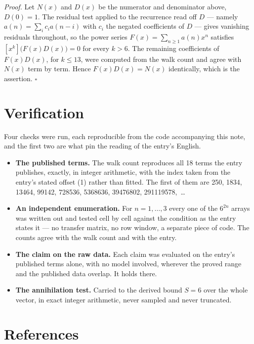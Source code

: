 \documentclass[11pt]{article}
\theoremstyle{definition}
\begin{document}
{\itshape Proof.} Let $N(x)$ and $D(x)$ be the numerator and denominator above, $D(0)=1$. The residual test applied to the recurrence read off $D$ --- namely $a(n) = \sum_i c_i a(n-i)$ with $c_i$ the negated coefficients of $D$ --- gives vanishing residuals throughout, so the power series $F(x)=\sum_{n\ge 1}a(n)x^n$ satisfies $[x^k]\bigl(F(x)D(x)\bigr) = 0$ for every $k > 6$. The remaining coefficients of $F(x)D(x)$, for $k \le 13$, were computed from the walk count and agree with $N(x)$ term by term. Hence $F(x)D(x) = N(x)$ identically, which is the assertion. $\square$

\section{Verification}

Four checks were run, each reproducible from the code accompanying this note, and the first two are what pin the reading of the entry's English.

\begin{itemize}

\item {\bfseries The published terms.} The walk count reproduces all 18 terms the entry publishes, exactly, in integer arithmetic, with the index taken from the entry's stated offset (1) rather than fitted. The first of them are 250, 1834, 13464, 99142, 728536, 5368636, 39476802, 291119578,~\dots

\item {\bfseries An independent enumeration.} For $n = 1,\dots,3$ every one of the $6^{2n}$ arrays was written out and tested cell by cell against the condition as the entry states it --- no transfer matrix, no row window, a separate piece of code. The counts agree with the walk count and with the entry.

\item {\bfseries The claim on the raw data.} Each claim was evaluated on the entry's published terms alone, with no model involved, wherever the proved range and the published data overlap. It holds there.

\item {\bfseries The annihilation test.} Carried to the derived bound $S = 6$ over the whole vector, in exact integer arithmetic, never sampled and never truncated.

\end{itemize}

\section{References}
\end{document}
